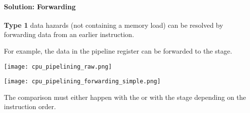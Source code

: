 
\paragraph{Solution: Forwarding}
\textbf{Type 1} data hazards (not containing a memory load) can be resolved by forwarding data from an earlier instruction.

\newpar{}
For example, the data in the  pipeline register can be forwarded to the  stage.


\texttt{[image: cpu\_pipelining\_raw.png]}


\begin{center}
    \texttt{[image: cpu\_pipelining\_forwarding\_simple.png]}
\end{center}
The comparison must either happen with the  or with the  stage depending on the instruction order.

